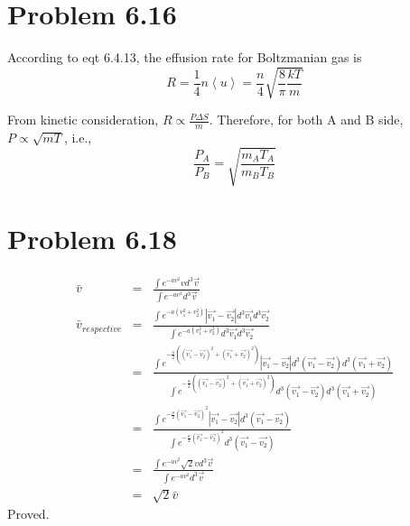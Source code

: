 \documentclass{article}
\begin{document}
\section*{Problem 6.16} %
\label{sec:problem_6_16}
	According to eqt 6.4.13, the effusion rate for Boltzmanian gas is
	\begin{equation}
		R=\frac{1}{4}n\left< u \right>= \frac{n}{4}\sqrt{\frac{8}{\pi} \frac{kT}{m}}
	\end{equation}

	From kinetic consideration, $ R \propto \frac{P \Delta S}{m} $. Therefore, for both A and B side, $ P \propto \sqrt{mT} $, i.e.,
	\begin{equation}
		\frac{P_A}{P_B}=\sqrt{\frac{m_AT_A}{m_BT_B}}
	\end{equation}
	


\section*{Problem 6.18}
\begin{eqnarray*}
\bar{v}&=&\frac{\int e^{-a v^2}v d^3\vec{v}}{\int e^{-a v^2} d^3\vec{v}}  \\
\bar{v}_{respective}&=&\frac{\int e^{-a (v^2_1+v^2_2)}|\vec{v_1}-\vec{v_2}| d^3\vec{v_1}d^3\vec{v_2}}{\int e^{-a (v^2_1+v^2_2)} d^3\vec{v_1}d^3\vec{v_2}}  \\
&=&\frac{\int e^{-\frac{a}{2} ((\vec{v_1}-\vec{v_2})^2+(\vec{v_1}+\vec{v_2})^2)}|\vec{v_1}-\vec{v_2}| d^3(\vec{v_1}-\vec{v_2})d^3(\vec{v_1}+\vec{v_2})}{\int e^{-\frac{a}{2} ((\vec{v_1}-\vec{v_2})^2+(\vec{v_1}+\vec{v_2})^2)} d^3(\vec{v_1}-\vec{v_2})d^3(\vec{v_1}+\vec{v_2})}  \\
&=&\frac{\int e^{-\frac{a}{2} (\vec{v_1}-\vec{v_2})^2}|\vec{v_1}-\vec{v_2}| d^3(\vec{v_1}-\vec{v_2})}{\int e^{-\frac{a}{2} (\vec{v_1}-\vec{v_2})^2} d^3(\vec{v_1}-\vec{v_2})}  \\
&=&\frac{\int e^{-a v^2}\sqrt{2}v d^3\vec{v}}{\int e^{-a v^2} d^3\vec{v}}  \\
&=&\sqrt{2}\bar{v}
\end{eqnarray*}
Proved.
\end{document}
